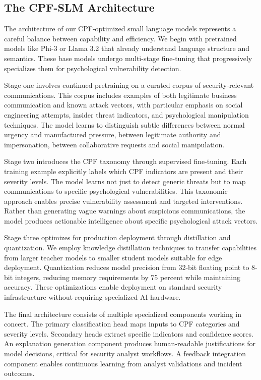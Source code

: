 \documentclass[11pt,a4paper]{article}
\begin{document}
\subsection{The CPF-SLM Architecture}

The architecture of our CPF-optimized small language models represents a careful balance between capability and efficiency. We begin with pretrained models like Phi-3 or Llama 3.2 that already understand language structure and semantics. These base models undergo multi-stage fine-tuning that progressively specializes them for psychological vulnerability detection.

Stage one involves continued pretraining on a curated corpus of security-relevant communications. This corpus includes examples of both legitimate business communication and known attack vectors, with particular emphasis on social engineering attempts, insider threat indicators, and psychological manipulation techniques. The model learns to distinguish subtle differences between normal urgency and manufactured pressure, between legitimate authority and impersonation, between collaborative requests and social manipulation.

Stage two introduces the CPF taxonomy through supervised fine-tuning. Each training example explicitly labels which CPF indicators are present and their severity levels. The model learns not just to detect generic threats but to map communications to specific psychological vulnerabilities. This taxonomic approach enables precise vulnerability assessment and targeted interventions. Rather than generating vague warnings about suspicious communications, the model produces actionable intelligence about specific psychological attack vectors.

Stage three optimizes for production deployment through distillation and quantization. We employ knowledge distillation techniques to transfer capabilities from larger teacher models to smaller student models suitable for edge deployment. Quantization reduces model precision from 32-bit floating point to 8-bit integers, reducing memory requirements by 75 percent while maintaining accuracy. These optimizations enable deployment on standard security infrastructure without requiring specialized AI hardware.

The final architecture consists of multiple specialized components working in concert. The primary classification head maps inputs to CPF categories and severity levels. Secondary heads extract specific indicators and confidence scores. An explanation generation component produces human-readable justifications for model decisions, critical for security analyst workflows. A feedback integration component enables continuous learning from analyst validations and incident outcomes.
\end{document}
